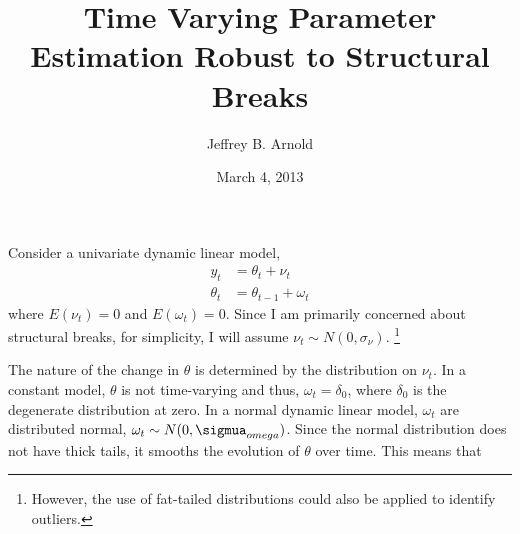 \documentclass{article}
\author{Jeffrey B. Arnold}
\title{Time Varying Parameter Estimation Robust to Structural Breaks}
\date{March 4, 2013}
\begin{document}
Consider a univariate dynamic linear model,
$$
\begin{aligned}
y_t &= \theta_t + \nu_t \\
\theta_t &= \theta_{t-1} + \omega_t
\end{aligned}
$$
where $E(\nu_t) = 0$ and $E(\omega_t) = 0$. Since I am primarily
concerned about structural breaks, for simplicity, I will assume
$\nu_t \sim N(0, \sigma_\nu)$.%
\footnote{However, the use of fat-tailed distributions could also be
  applied to identify outliers.}

The nature of the change in $\theta$ is determined by the distribution on $\nu_t$.  
In a constant model, $\theta$ is not time-varying and thus, $\omega_{t} = \delta_{0}$, where $\delta_{0}$ is the degenerate distribution at zero.
In a normal dynamic linear model, $\omega_{t}$ are distributed normal, $\omega_{t} \sim N(0, \sigmua_{omega})$.
Since the normal distribution does not have thick tails, it smooths the evolution of $\theta$ over time. 
This means that 
\end{document}
